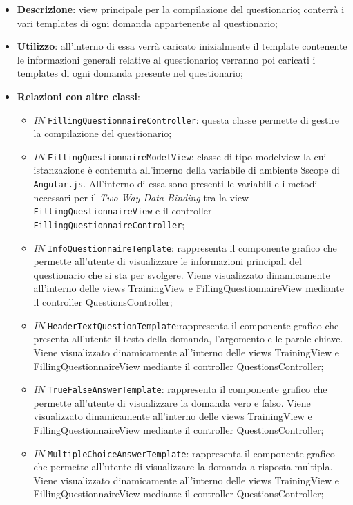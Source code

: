 \begin{itemize}
	\item \textbf{Descrizione}: view principale per la compilazione del questionario; conterrà i vari templates di ogni domanda appartenente al questionario;
	\item \textbf{Utilizzo}: all'interno di essa verrà caricato inizialmente il template contenente le informazioni generali relative al questionario; verranno poi caricati i templates di ogni domanda presente nel questionario;
	\item \textbf{Relazioni con altre classi}: 
	\begin{itemize}
		\item \textit{IN} \texttt{FillingQuestionnaireController}: questa classe permette di gestire la compilazione del questionario;
		\item \textit{IN} \texttt{FillingQuestionnaireModelView}: classe di tipo modelview la cui istanzazione è contenuta all'interno della variabile di ambiente \$scope di \texttt{Angular.js}. All'interno di essa sono presenti le variabili e i metodi necessari per il \textit{Two-Way Data-Binding} tra la view \texttt{FillingQuestionnaireView} e il controller \texttt{FillingQuestionnaireController};
		\item \textit{IN} \texttt{InfoQuestionnaireTemplate}: rappresenta il componente grafico che permette all'utente di visualizzare le informazioni principali del questionario che si sta per svolgere. Viene visualizzato dinamicamente all'interno delle views TrainingView e FillingQuestionnaireView mediante il controller QuestionsController;
		\item \textit{IN} \texttt{HeaderTextQuestionTemplate}:rappresenta il componente grafico che presenta all'utente il testo della domanda, l'argomento e le parole chiave. Viene visualizzato dinamicamente all'interno delle views TrainingView e FillingQuestionnaireView mediante il controller QuestionsController;
		\item \textit{IN} \texttt{TrueFalseAnswerTemplate}: rappresenta il componente grafico che permette all'utente di visualizzare la domanda vero e falso. Viene visualizzato dinamicamente all'interno delle views TrainingView e FillingQuestionnaireView mediante il controller QuestionsController;
		\item \textit{IN} \texttt{MultipleChoiceAnswerTemplate}: rappresenta il componente grafico che permette all'utente di visualizzare la domanda a risposta multipla. Viene visualizzato dinamicamente all'interno delle views TrainingView e FillingQuestionnaireView mediante il controller QuestionsController;

\end{itemize}
\end{itemize}
